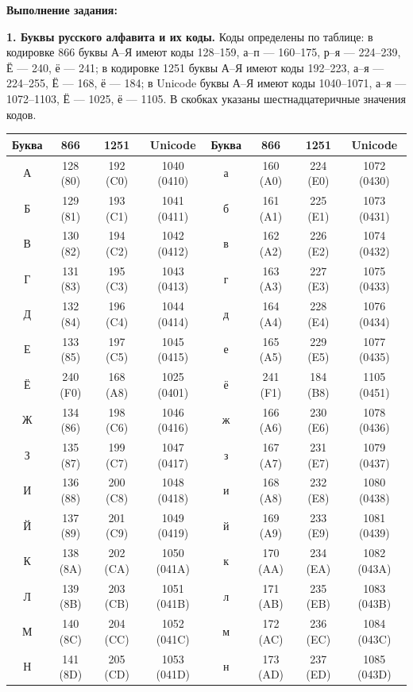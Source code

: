 \documentclass[a4paper, 12pt]{article}
\begin{document}
\textbf{ Выполнение задания:}

\textbf{1. Буквы русского алфавита и их коды.} Коды определены по таблице: в кодировке 866 буквы А--Я имеют коды 128--159,
а--п --- 160--175, р--я --- 224--239, Ё --- 240, ё --- 241; в кодировке 1251 буквы А--Я имеют коды 192--223,
а--я --- 224--255, Ё --- 168, ё --- 184; в Unicode буквы А--Я имеют коды 1040--1071, а--я --- 1072--1103,
Ё --- 1025, ё --- 1105. В скобках указаны шестнадцатеричные значения кодов.

{\small
\begin{longtable}{|c|c|c|c||c|c|c|c|}
\hline
Буква & 866 & 1251 & Unicode & Буква & 866 & 1251 & Unicode \\ \hline
\endhead
А & 128 (80) & 192 (C0) & 1040 (0410) & а & 160 (A0) & 224 (E0) & 1072 (0430) \\ \hline
Б & 129 (81) & 193 (C1) & 1041 (0411) & б & 161 (A1) & 225 (E1) & 1073 (0431) \\ \hline
В & 130 (82) & 194 (C2) & 1042 (0412) & в & 162 (A2) & 226 (E2) & 1074 (0432) \\ \hline
Г & 131 (83) & 195 (C3) & 1043 (0413) & г & 163 (A3) & 227 (E3) & 1075 (0433) \\ \hline
Д & 132 (84) & 196 (C4) & 1044 (0414) & д & 164 (A4) & 228 (E4) & 1076 (0434) \\ \hline
Е & 133 (85) & 197 (C5) & 1045 (0415) & е & 165 (A5) & 229 (E5) & 1077 (0435) \\ \hline
Ё & 240 (F0) & 168 (A8) & 1025 (0401) & ё & 241 (F1) & 184 (B8) & 1105 (0451) \\ \hline
Ж & 134 (86) & 198 (C6) & 1046 (0416) & ж & 166 (A6) & 230 (E6) & 1078 (0436) \\ \hline
З & 135 (87) & 199 (C7) & 1047 (0417) & з & 167 (A7) & 231 (E7) & 1079 (0437) \\ \hline
И & 136 (88) & 200 (C8) & 1048 (0418) & и & 168 (A8) & 232 (E8) & 1080 (0438) \\ \hline
Й & 137 (89) & 201 (C9) & 1049 (0419) & й & 169 (A9) & 233 (E9) & 1081 (0439) \\ \hline
К & 138 (8A) & 202 (CA) & 1050 (041A) & к & 170 (AA) & 234 (EA) & 1082 (043A) \\ \hline
Л & 139 (8B) & 203 (CB) & 1051 (041B) & л & 171 (AB) & 235 (EB) & 1083 (043B) \\ \hline
М & 140 (8C) & 204 (CC) & 1052 (041C) & м & 172 (AC) & 236 (EC) & 1084 (043C) \\ \hline
Н & 141 (8D) & 205 (CD) & 1053 (041D) & н & 173 (AD) & 237 (ED) & 1085 (043D) \\ \hline

\end{longtable}}
\end{document}
